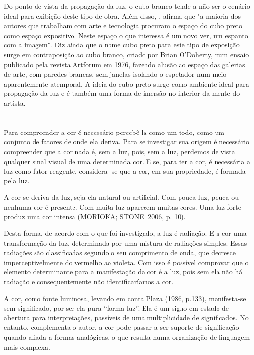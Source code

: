 Do ponto de vista da propagação da luz, o cubo branco tende a não ser o cenário ideal para exibição deste tipo de obra. Além disso, , afirma que "a maioria dos autores que trabalham com arte e tecnologia procuram o espaço do cubo preto como espaço expositivo. Neste espaço o que interessa é um novo ver, um espanto com a imagem". Diz ainda que o nome cubo preto para este tipo de exposição surge em contraposição ao cubo branco, criado por Brian O'Doherty, num ensaio publicado pela revista Artforum em 1976, fazendo alusão ao espaço das galerias de arte, com paredes brancas, sem janelas isolando o espetador num meio aparentemente atemporal. A ideia do cubo preto surge como ambiente ideal para propagação da luz e é também uma forma de imersão no interior da mente do artista.


\section{  }

Para compreender a cor é necessário percebê-la como um todo, como um conjunto de fatores de onde ela deriva. Para se investigar sua origem é necessário compreender que a cor nada é, sem a luz, pois, sem a luz, perdemos de vista qualquer sinal visual de uma determinada cor. E se, para ter a cor, é necessária a luz como fator reagente, considera- se que a cor, em sua propriedade, é formada pela luz. \cite[p. 55]{henno}


A cor se deriva da luz, seja ela natural ou artificial. Com pouca luz, pouca ou nenhuma cor é presente. Com muita luz aparecem muitas cores. Uma luz forte produz uma cor intensa (MORIOKA; STONE, 2006, p. 10). \cite[p.56]{henno}

Desta forma, de acordo com o que foi investigado, a luz é radiação. E a cor uma transformação da luz, determinada por uma mistura de radiações simples. Essas radiações são classificadas segundo o seu comprimento de onda, que decresce imperceptivelmente do vermelho ao violeta. Com isso é possível comprovar que o elemento determinante para a manifestação da cor é a luz, pois sem ela não há radiação e consequentemente não identificaríamos a cor. \cite[p.56]{henno}

A cor, como fonte luminosa, levando em conta Plaza (1986, p.133), manifesta-se sem significado, por ser ela pura “forma-luz”. Ela é um signo em estado de abertura para interpretações, passíveis de uma multiplicidade de significados. No entanto, complementa o autor, a cor pode passar a ser suporte de significação quando aliada a formas analógicas, o que resulta numa organização de linguagem mais complexa. \cite[p.60]{henno}


